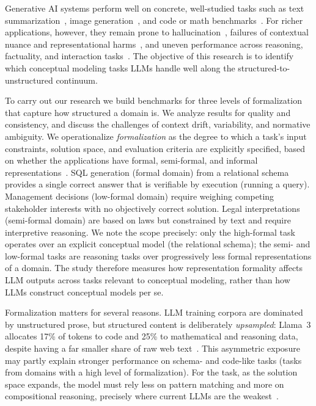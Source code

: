 \documentclass[runningheads]{llncs}
\begin{document}
Generative AI systems perform well on concrete, well-studied tasks such as text summarization~\cite{DBLP:conf/acl/LewisLGGMLSZ20}, image generation~\cite{rombach2022high}, and code or math benchmarks~\cite{DBLP:conf/nips/LewkowyczADDMRS22,li2022alphacode}. For richer applications, however, they remain prone to hallucination~\cite{huang2025survey,ji2023survey}, failures of contextual nuance and representational harms~\cite{bender2021dangers}, and uneven performance across reasoning, factuality, and interaction tasks~\cite{bang2023multitask}. The objective of this research is to identify which conceptual modeling tasks LLMs handle well along the structured-to-unstructured continuum.

To carry out our research we build benchmarks for three levels of formalization that capture how structured a domain is. We analyze results for quality and consistency, and discuss the challenges of context drift, variability, and normative ambiguity. We operationalize \emph{formalization} as the degree to which a task's input constraints, solution space, and evaluation criteria are explicitly specified, based on whether the applications have formal, semi-formal, and informal representations~\cite{mylopoulos1992conceptual,olive2007conceptual,DBLP:journals/isj/WandW93}. SQL generation (formal domain) from a relational schema provides a single correct answer that is verifiable by execution (running a query). Management decisions (low-formal domain) require weighing competing stakeholder interests with no objectively correct solution. Legal interpretations (semi-formal domain) are based on laws but constrained by text and require interpretive reasoning. We note the scope precisely: only the high-formal task operates over an explicit conceptual model (the relational schema); the semi- and low-formal tasks are reasoning tasks over progressively less formal representations of a domain. The study therefore measures how representation formality affects LLM outputs across tasks relevant to conceptual modeling, rather than how LLMs construct conceptual models per se.

Formalization matters for several reasons. LLM training corpora are dominated by unstructured prose, but structured content is deliberately \emph{upsampled}: Llama~3 allocates 17\% of tokens to code and 25\% to mathematical and reasoning data, despite having a far smaller share of raw web text~\cite{grattafiori2024llama3herdmodels}. This asymmetric exposure may partly explain stronger performance on schema- and code-like tasks (tasks from domains with a high level of formalization). For the task, as the solution space expands, the model must rely less on pattern matching and more on compositional reasoning, precisely where current LLMs are the weakest~\cite{dziri2023faith}.
\end{document}
